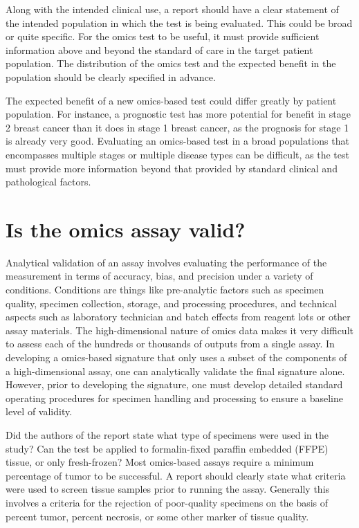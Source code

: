 \documentclass[11pt]{article}
\begin{document}
Along with the intended clinical use, a report should have a clear
statement of the intended population in which the test is being
evaluated. This could be broad or quite specific. For the omics test to
be useful, it must provide sufficient information above and beyond the
standard of care in the target patient population. The distribution of
the omics test and the expected benefit in the population should be
clearly specified in advance.

The expected benefit of a new omics-based test could differ greatly by
patient population. For instance, a prognostic test has more potential
for benefit in stage 2 breast cancer than it does in stage 1 breast
cancer, as the prognosis for stage 1 is already very good. Evaluating an
omics-based test in a broad populations that encompasses multiple stages
or multiple disease types can be difficult, as the test must provide
more information beyond that provided by standard clinical and
pathological factors.

\section{Is the omics assay valid?}\label{is-the-omics-assay-valid}

Analytical validation of an assay involves evaluating the performance of
the measurement in terms of accuracy, bias, and precision under a
variety of conditions. Conditions are things like pre-analytic factors
such as specimen quality, specimen collection, storage, and processing
procedures, and technical aspects such as laboratory technician and
batch effects from reagent lots or other assay materials. The
high-dimensional nature of omics data makes it very difficult to assess
each of the hundreds or thousands of outputs from a single assay. In
developing a omics-based signature that only uses a subset of the
components of a high-dimensional assay, one can analytically validate
the final signature alone. However, prior to developing the signature,
one must develop detailed standard operating procedures for specimen
handling and processing to ensure a baseline level of validity.

Did the authors of the report state what type of specimens were used in
the study? Can the test be applied to formalin-fixed paraffin embedded
(FFPE) tissue, or only fresh-frozen? Most omics-based assays require a
minimum percentage of tumor to be successful. A report should clearly
state what criteria were used to screen tissue samples prior to running
the assay. Generally this involves a criteria for the rejection of
poor-quality specimens on the basis of percent tumor, percent necrosis,
or some other marker of tissue quality.
\end{document}
